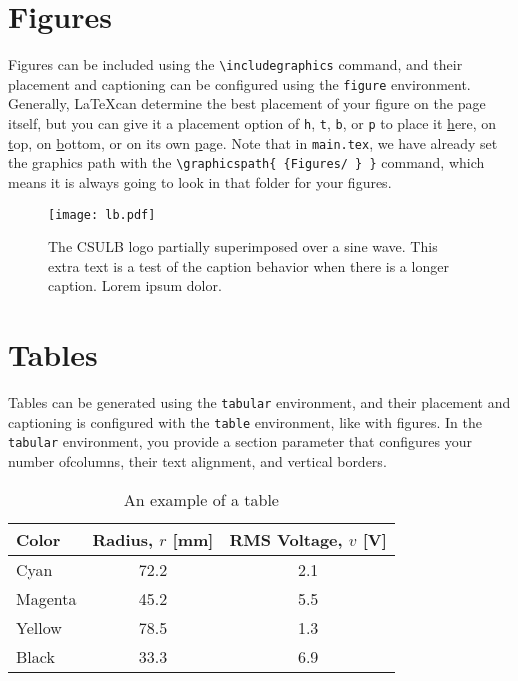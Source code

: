 \section*{Figures}
Figures can be included using the \texttt{\textbackslash includegraphics} command, and their placement and captioning can be configured using the \texttt{figure} environment. Generally, \LaTeX can determine the best placement of your figure on the page itself, but you can give it a placement option of \texttt{h}, \texttt{t}, \texttt{b}, or \texttt{p} to place it \underline{h}ere, on \underline{t}op, on \underline{b}ottom, or on its own \underline{p}age. Note that in \texttt{main.tex}, we have already set the graphics path with the \texttt{\textbackslash graphicspath\{ \{Figures/ \} \}} command, which means it is always going to look in that folder for your figures.

\begin{figure}[ht]
	\centering
	\texttt{[image: lb.pdf]}
	\caption{The CSULB logo partially superimposed over a sine wave. This extra text is a test of the caption behavior when there is a longer caption. Lorem ipsum dolor.}
	\label{fig:exampleFig}
\end{figure}

\section*{Tables}
Tables can be generated using the \texttt{tabular} environment, and their placement and captioning is configured with the \texttt{table} environment, like with figures. In the \texttt{tabular} environment, you provide a section parameter that configures your number ofcolumns, their text alignment, and vertical borders.

\begin{table}[ht]
	\centering
	\caption{An example of a table}
	\begin{tabular}{l c c}
		\hline
		Color	&  Radius, $r$ [mm] & RMS Voltage, $v$ [V] \\
		\hline
		Cyan	&	72.2	&	2.1 \\
		Magenta	&	45.2	&	5.5 \\
		Yellow	&	78.5	&	1.3 \\
		Black	&	33.3	&	6.9 \\
		\hline
	\end{tabular}
	\label{tab:exampleTable}
\end{table}


